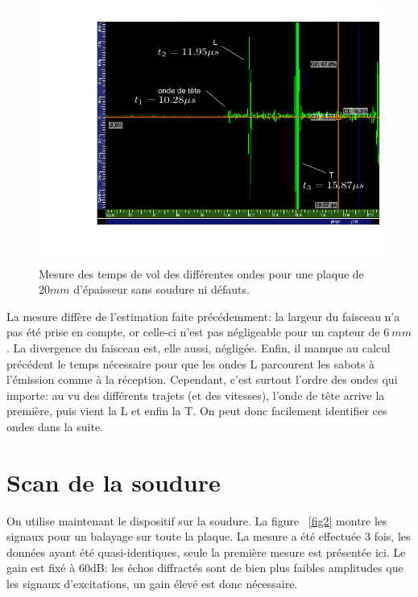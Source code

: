 \documentclass[twoside]{article}
\begin{document}
\begin{multicols}{2}
\begin{figure}[H]
\centering
\includegraphics[scale=0.4]{./images/mesure_SD1.png}
\caption{\label{fig1} Mesure des temps de vol des différentes ondes pour une plaque de $20 mm$ d'épaisseur sans soudure ni défauts.}
\end{figure}

La mesure diffère de l'estimation faite précédemment: la largeur du faisceau n'a pas été prise en compte, or celle-ci n'est pas négligeable pour un capteur de $6~mm$. La divergence du faisceau est, elle aussi, négligée. Enfin, il manque au calcul précédent le temps nécessaire pour que les ondes L parcourent les sabots à l'émission comme à la réception. Cependant, c'est surtout l'ordre des ondes qui importe: au vu des différents trajets (et des vitesses), l'onde de tête arrive la première, puis vient la L et enfin la T. On peut donc facilement identifier ces ondes dans la suite.



\section{Scan de la soudure}
On utilise maintenant le dispositif sur la soudure. La figure ~\ref{fig2} montre les signaux pour un balayage sur toute la plaque. La mesure a été effectuée 3 fois, les données ayant été quasi-identiques, seule la première mesure est présentée ici. Le gain est fixé à 60dB: les échos diffractés sont de bien plus faibles amplitudes que les signaux d'excitations, un gain élevé est donc nécessaire.


\end{multicols}
\end{document}
